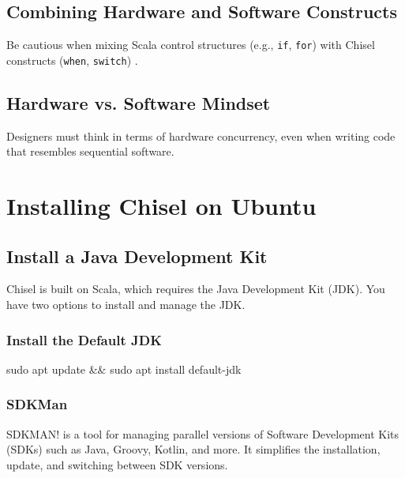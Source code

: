 \subsection{Combining Hardware and Software Constructs}
Be cautious when mixing Scala control structures (e.g., \texttt{if}, \texttt{for}) with Chisel constructs (\texttt{when}, \texttt{switch}) \cite{chisel-tutorial}.

\subsection{Hardware vs. Software Mindset}
Designers must think in terms of hardware concurrency, even when writing code that resembles sequential software.

\section{Installing Chisel on Ubuntu}
\subsection{Install a Java Development Kit}
Chisel is built on Scala, which requires the Java Development Kit (JDK). You have two options to install and manage the JDK.

\subsubsection{Install the Default JDK}
\begin{bashcode}
sudo apt update && sudo apt install default-jdk
\end{bashcode}

\subsubsection{SDKMan}

SDKMAN! is a tool for managing parallel versions of Software Development Kits (SDKs) such as Java, Groovy, Kotlin, and more. It simplifies the installation, update, and switching between SDK versions.

